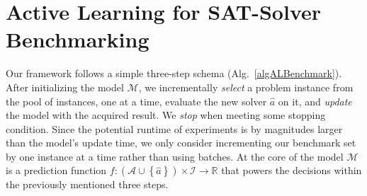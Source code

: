 \documentclass[runningheads]{llncs}
\begin{document}
\section{Active Learning for SAT-Solver Benchmarking}
\label{sec:main}
Our framework follows a simple three-step schema (Alg.~\ref{algALBenchmark}).
After initializing the model $\mathcal{M}$, we incrementally \emph{select} a problem instance from the pool of instances, one at a time, evaluate the new solver $\hat{a}$ on it, and \emph{update} the model with the acquired result.
We \emph{stop} when meeting some stopping condition.
Since the potential runtime of experiments is by magnitudes larger than the model's update time, we only consider incrementing our benchmark set by one instance at a time rather than using batches.
At the core of the model $\mathcal{M}$ is a prediction function $f\!: \left(\mathcal{A} \cup \left\lbrace \hat{a} \right\rbrace\right) \times \mathcal{I} \rightarrow \mathbb{R}$ that powers the decisions within the previously mentioned three steps.
\end{document}
